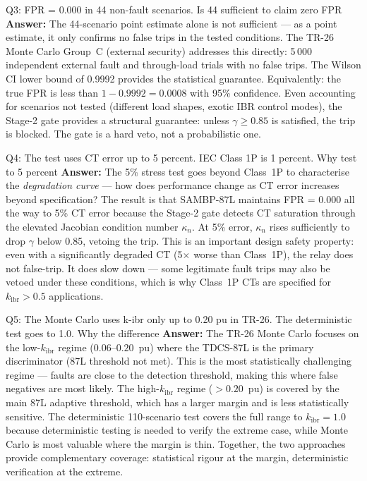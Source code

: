 \documentclass[12pt,a4paper]{article}
\newcommand{\kibr}{k_\mathrm{ibr}}
\begin{document}
\begin{keybox}{Q3: FPR = 0.000 in 44 non-fault scenarios. Is 44 sufficient to claim zero FPR}
\textbf{Answer:} The 44-scenario point estimate alone is not sufficient --- as a point estimate, it only confirms no false trips in the tested conditions. The TR-26 Monte Carlo Group~C (external security) addresses this directly: 5\,000 independent external fault and through-load trials with no false trips. The Wilson CI lower bound of 0.9992 provides the statistical guarantee. Equivalently: the true FPR is less than $1 - 0.9992 = 0.0008$ with 95\% confidence. Even accounting for scenarios not tested (different load shapes, exotic IBR control modes), the Stage-2 gate provides a structural guarantee: unless $\gamma \geq 0.85$ is satisfied, the trip is blocked. The gate is a hard veto, not a probabilistic one.
\end{keybox}

\begin{keybox}{Q4: The test uses CT error up to 5 percent. IEC Class 1P is 1 percent. Why test to 5 percent}
\textbf{Answer:} The 5\% stress test goes beyond Class~1P to characterise the \emph{degradation curve} --- how does performance change as CT error increases beyond specification? The result is that SAMBP-87L maintains FPR = 0.000 all the way to 5\% CT error because the Stage-2 gate detects CT saturation through the elevated Jacobian condition number $\kappa_n$. At 5\% error, $\kappa_n$ rises sufficiently to drop $\gamma$ below 0.85, vetoing the trip. This is an important design safety property: even with a significantly degraded CT (5$\times$ worse than Class~1P), the relay does not false-trip. It does slow down --- some legitimate fault trips may also be vetoed under these conditions, which is why Class~1P CTs are specified for $\kibr > 0.5$ applications.
\end{keybox}

\begin{keybox}{Q5: The Monte Carlo uses k-ibr only up to 0.20 pu in TR-26. The deterministic test goes to 1.0. Why the difference}
\textbf{Answer:} The TR-26 Monte Carlo focuses on the low-$\kibr$ regime ($0.06$--$0.20$~pu) where the TDCS-87L is the primary discriminator (87L threshold not met). This is the most statistically challenging regime --- faults are close to the detection threshold, making this where false negatives are most likely. The high-$\kibr$ regime ($> 0.20$~pu) is covered by the main 87L adaptive threshold, which has a larger margin and is less statistically sensitive. The deterministic 110-scenario test covers the full range to $\kibr = 1.0$ because deterministic testing is needed to verify the extreme case, while Monte Carlo is most valuable where the margin is thin. Together, the two approaches provide complementary coverage: statistical rigour at the margin, deterministic verification at the extreme.
\end{keybox}
\end{document}
